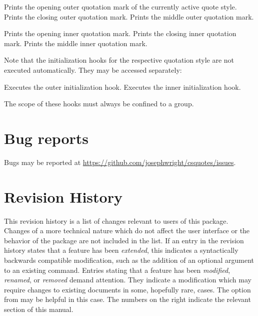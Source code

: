 \documentclass{ltxdockit}[2010/09/26]
\begin{document}
\begin{ltxsyntax}

 Prints the opening outer quotation mark of the currently active quote style.
 Prints the closing outer quotation mark.
 Prints the middle outer quotation mark.

 Prints the opening inner quotation mark.
 Prints the closing inner quotation mark.
 Prints the middle inner quotation mark.

\end{ltxsyntax}

Note that the initialization hooks for the respective quotation style are not executed automatically. They may be accessed separately:

\begin{ltxsyntax}

 Executes the outer initialization hook.
 Executes the inner initialization hook.

\end{ltxsyntax}

The scope of these hooks must always be confined to a group.

\section{Bug reports}

Bugs may be reported at \url{https://github.com/josephwright/csquotes/issues}.

\section{Revision History}

This revision history is a list of changes relevant to users of this package. Changes of a more technical nature which do not affect the user interface or the behavior of the package are not included in the list. If an entry in the revision history states that a feature has been \emph{extended}, this indicates a syntactically backwards compatible modification, such as the addition of an optional argument to an existing command. Entries stating that a feature has been \emph{modified}, \emph{renamed}, or \emph{removed} demand attention. They indicate a modification which may require changes to existing documents in some, hopefully rare, cases. The  option from  may be helpful in this case. The numbers on the right indicate the relevant section of this manual.
\end{document}
